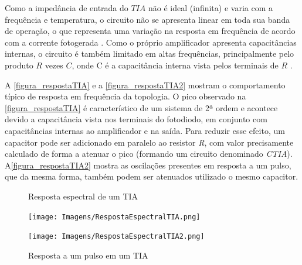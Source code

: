 Como a imped\^ancia de entrada do $TIA$ não \'e ideal (infinita) e varia com a frequ\^encia e temperatura, o circuito não se apresenta linear em toda sua banda de operação, o que representa uma variação na resposta em frequ\^encia de acordo com a corrente fotogerada \cite{hamamatsu}.
Como o pr\'oprio amplificador apresenta capacit\^ancias internas, o circuito \'e tamb\'em limitado em altas frequ\^encias, principalmente pelo produto $R$ vezes $C$, onde C \'e a capacit\^ancia interna vista pelos terminais de $R$ \cite{hamamatsu}.

A \autoref{figura_respostaTIA} e a \autoref{figura_respostaTIA2} mostram o comportamento t\'ipico de resposta em frequ\^encia da topologia. O pico observado na \autoref{figura_respostaTIA} é característico de um sistema de 2ª ordem e acontece devido a capacitância vista nos terminais do fotodiodo, em conjunto com capacitâncias internas ao amplificador e na saída. Para reduzir esse efeito, um capacitor pode ser adicionado em paralelo ao resistor \textit{R}, com valor precisamente calculado de forma a atenuar o pico (formando um circuito denominado \textit{CTIA}). A\autoref{figura_respostaTIA2} mostra as oscilações presentes em resposta a um pulso, que da mesma forma, também podem ser atenuados utilizado o mesmo capacitor.

\begin{figure}[!h]
    \begin{minipage}{0.4\textwidth}
    \centering
    \caption{\label{figura_respostaTIA}Resposta espectral de um TIA}
	\texttt{[image: Imagens/RespostaEspectralTIA.png]}
	\end{minipage}
	 \hfill
  \begin{minipage}{0.4\textwidth}
    \centering
    \caption{\label{figura_respostaTIA2}Resposta a um pulso em um TIA}
    \texttt{[image: Imagens/RespostaEspectralTIA2.png]}
  \end{minipage}
  
	
\end{figure}